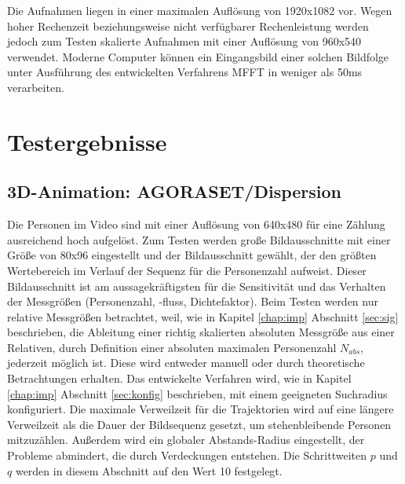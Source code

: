 Die Aufnahmen liegen in einer maximalen Auflösung von 1920x1082 vor. Wegen hoher Rechenzeit beziehungsweise nicht verfügbarer Rechenleistung werden jedoch zum Testen skalierte Aufnahmen mit einer Auflösung von 960x540 verwendet. Moderne Computer können ein Eingangsbild einer solchen Bildfolge unter Ausführung des entwickelten Verfahrens MFFT in weniger als 50ms verarbeiten.

\section{Testergebnisse}
\label{test:erg}

\subsection{3D-Animation: AGORASET/Dispersion \cite{CourtyPRL2014} \cite{Allain2012ICPR}}
\label{dispersion_test}
Die Personen im Video sind mit einer Auflösung von 640x480 für eine Zählung ausreichend hoch aufgelöst. Zum Testen werden große Bildausschnitte mit einer Größe von 80x96 eingestellt und der Bildausschnitt gewählt, der den größten Wertebereich im Verlauf der Sequenz für die Personenzahl aufweist. Dieser Bildausschnitt ist am aussagekräftigsten für die Sensitivität und das Verhalten der Messgrößen (Personenzahl, -fluss, Dichtefaktor). Beim Testen werden nur relative Messgrößen betrachtet, weil, wie in Kapitel \ref{chap:imp} Abschnitt \ref{sec:sig} beschrieben, die Ableitung einer richtig skalierten absoluten Messgröße aus einer Relativen, durch Definition einer absoluten maximalen Personenzahl $N_{abs}$, jederzeit möglich ist. Diese wird entweder manuell oder durch theoretische Betrachtungen erhalten. Das entwickelte Verfahren wird, wie in Kapitel \ref{chap:imp} Abschnitt \ref{sec:konfig} beschrieben, mit einem geeigneten Suchradius konfiguriert. Die maximale Verweilzeit für die Trajektorien wird auf eine längere Verweilzeit als die Dauer der Bildsequenz gesetzt, um stehenbleibende Personen mitzuzählen. Außerdem wird ein globaler Abstands-Radius eingestellt, der Probleme abmindert, die durch Verdeckungen entstehen. Die Schrittweiten $p$ und $q$ werden in diesem Abschnitt auf den Wert 10 festgelegt.

